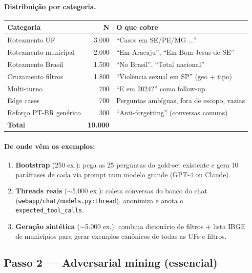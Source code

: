 \documentclass[11pt,a4paper]{article}
\newcommand{\code}[1]{\texttt{\small #1}}
\begin{document}
\paragraph{Distribuição por categoria.}

\begin{table}[h!]
\centering
\small
\begin{tabular}{@{}l r l@{}}
\toprule
\textbf{Categoria} & \textbf{N} & \textbf{O que cobre} \\
\midrule
Roteamento UF              & 3.000 & ``Casos em SE/PE/MG ...'' \\
Roteamento municipal       & 2.000 & ``Em Aracaju'', ``Em Bom Jesus de SE'' \\
Roteamento Brasil          & 1.500 & ``No Brasil'', ``Total nacional'' \\
Cruzamento filtros         & 1.800 & ``Violência sexual em SP'' (geo + tipo) \\
Multi-turno                &   700 & ``E em 2024?'' como follow-up \\
Edge cases                 &   700 & Perguntas ambíguas, fora de escopo, vazias \\
Reforço PT-BR genérico     &   300 & ``Anti-forgetting'' (conversas comuns) \\
\midrule
\textbf{Total}             & \textbf{10.000} & \\
\bottomrule
\end{tabular}
\end{table}

\paragraph{De onde vêm os exemplos:}

\begin{enumerate}[leftmargin=*]
\item \textbf{Bootstrap} (250 ex.): pega as 25 perguntas do gold-set
existente e gera 10 paráfrases de cada via prompt num modelo grande
(GPT-4 ou Claude).
\item \textbf{Threads reais} ($\sim$5.000 ex.): coleta conversas do
banco do chat (\code{webapp/chat/models.py:Thread}), anonimiza e
anota o \code{expected\_tool\_calls}.
\item \textbf{Geração sintética} ($\sim$5.000 ex.): combina dicionário
de filtros + lista IBGE de municípios para gerar exemplos canônicos
de todas as UFs e filtros.
\end{enumerate}

\subsection{Passo 2 --- Adversarial mining (essencial)}
\end{document}
